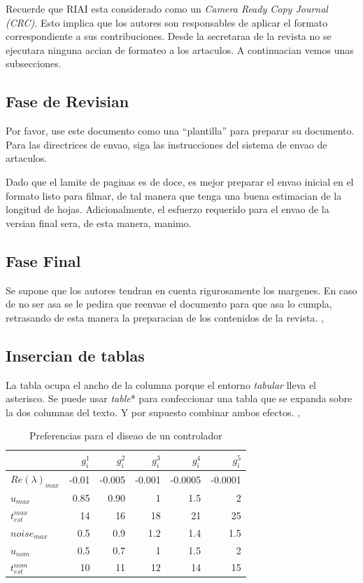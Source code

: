\documentclass[5p,times,authoryear]{elsarticle}
\begin{document}
Recuerde que RIAI esta considerado como un \emph{Camera Ready Copy Journal (CRC)}. Esto implica que los autores son responsables de aplicar el formato correspondiente a sus contribuciones. Desde la secretaraa de la revista no se ejecutara ninguna accian de formateo a los artaculos. A continuacian vemos unas subsecciones.

\subsection{Fase de Revisian}

Por favor, use este documento como una ``plantilla'' para preparar su documento. Para las directrices de envao, siga las instrucciones del sistema de envao de artaculos.

Dado que el lamite de paginas es de doce, es mejor preparar el envao inicial en el formato listo para filmar, de tal manera que tenga una buena estimacian de la longitud de hojas. Adicionalmente, el esfuerzo requerido para el envao de la versian final sera, de esta manera, manimo.

\subsection{Fase Final}

Se supone que los autores tendran en cuenta rigurosamente los margenes. En caso de no ser asa se le pedira que reenvae el documento para que asa lo cumpla, retrasando de esta manera la preparacian de los contenidos de la revista. \citep{Bak:63a}, \citep{Bak:63b}

\subsection{Insercian de tablas}

La tabla ocupa el ancho de la columna porque el entorno \emph{tabular} lleva el asterisco. Se puede usar \emph{table}* para confeccionar una tabla que se expanda sobre la dos columnas del texto. Y por supuesto combinar ambos efectos. \citep{Heritage:92}, \citep{ChaRou:66}


\begin{table}[htbp]
  \caption{Preferencias para el diseao de un controlador}
   \label{extremos45}
  \begin{tabular*}{\hsize}{lrrrrr}
\hline
    & $g_i^1$ & $g_i^2$ & $g_i^3$ & $g_i^4$ & $g_i^5$ \\
    \hline
$Re(\lambda)_{max}$ & -0.01  & -0.005 & -0.001 & -0.0005 & -0.0001 \\
$u_{max}$& 0.85 & 0.90 & 1 & 1.5 & 2  \\
$t_{est}^{max}$& 14 & 16 & 18 & 21 & 25 \\
$noise_{max}$& 0.5 & 0.9 & 1.2 & 1.4 & 1.5  \\
$u_{nom}$& 0.5 & 0.7 & 1  & 1.5 & 2  \\
$t_{est}^{nom}$& 10 & 11 & 12 & 14 & 15 \\
\hline
  \end{tabular*}
\end{table}
\end{document}
